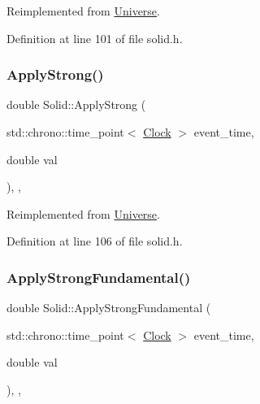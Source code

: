 Reimplemented from \hyperlink{class_universe_a76c0b5e63c2a7d1988c44db341c3d64c}{Universe}.



Definition at line 101 of file solid.\+h.

\mbox{\label{class_solid_a0801ec0382bc509191575bcf9f5c83c1}} 
\subsubsection{\texorpdfstring{Apply\+Strong()}{ApplyStrong()}}
{\footnotesize\ttfamily double Solid\+::\+Apply\+Strong (\begin{DoxyParamCaption}\item[{std\+::chrono\+::time\+\_\+point$<$ \hyperlink{universe_8h_a0ef8d951d1ca5ab3cfaf7ab4c7a6fd80}{Clock} $>$}]{event\+\_\+time,  }\item[{double}]{val }\end{DoxyParamCaption})\hspace{0.3cm}{\ttfamily [inline]}, {\ttfamily [final]}, {\ttfamily [virtual]}}



Reimplemented from \hyperlink{class_universe_a906a88b37f10bfa630bef49dfd0e907a}{Universe}.



Definition at line 106 of file solid.\+h.

\mbox{\label{class_solid_abd8fff76385306f97aa65dfd6b867fc6}} 
\subsubsection{\texorpdfstring{Apply\+Strong\+Fundamental()}{ApplyStrongFundamental()}}
{\footnotesize\ttfamily double Solid\+::\+Apply\+Strong\+Fundamental (\begin{DoxyParamCaption}\item[{std\+::chrono\+::time\+\_\+point$<$ \hyperlink{universe_8h_a0ef8d951d1ca5ab3cfaf7ab4c7a6fd80}{Clock} $>$}]{event\+\_\+time,  }\item[{double}]{val }\end{DoxyParamCaption})\hspace{0.3cm}{\ttfamily [inline]}, {\ttfamily [final]}, {\ttfamily [virtual]}}




